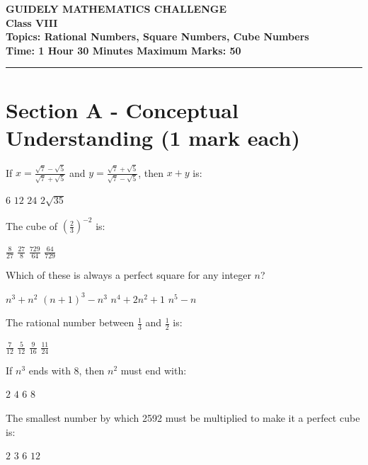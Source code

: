 \documentclass[11pt,a4paper]{exam}
\newcommand{\FULLMARKS}{Maximum Marks: 50}
\newcommand{\FULLTIME}{Time: 1 Hour 30 Minutes}
\newcommand{\GetInstructions}{
	\section*{General Instructions:}
	\begin{enumerate}
		\item All questions are compulsory
		\item Show all working steps for full marks
		\item Use mathematical reasoning to justify your answers
		\item Calculators are not permitted
		\item Extra credit will be given for elegant solutions
	\end{enumerate}
}
\begin{document}
	
	\begin{center}
		\Large\textbf{GUIDELY MATHEMATICS CHALLENGE} \\
		\large\textbf{Class VIII} \\
		\textbf{Topics: Rational Numbers, Square Numbers, Cube Numbers} \\
		\textbf{\FULLTIME \hspace{1cm} \FULLMARKS} \\
		\rule{\textwidth}{1pt}
	\end{center}
	
	
	\section*{Section A - Conceptual Understanding (1 mark each)}
	\begin{questions}
		\question If $x = \frac{\sqrt{7} - \sqrt{5}}{\sqrt{7} + \sqrt{5}}$ and $y = \frac{\sqrt{7} + \sqrt{5}}{\sqrt{7} - \sqrt{5}}$, then $x + y$ is:
		\begin{choices}
			\choice $6$
			\choice $12$
			\choice $24$
			\choice $2\sqrt{35}$
		\end{choices}
		
		\question The cube of $\left(\frac{2}{3}\right)^{-2}$ is:
		\begin{choices}
			\choice $\frac{8}{27}$
			\choice $\frac{27}{8}$
			\choice $\frac{729}{64}$
			\choice $\frac{64}{729}$
		\end{choices}
		
		\question Which of these is always a perfect square for any integer $n$?
		\begin{choices}
			\choice $n^3 + n^2$
			\choice $(n+1)^3 - n^3$
			\choice $n^4 + 2n^2 + 1$
			\choice $n^5 - n$
		\end{choices}
		
		\question The rational number between $\frac{1}{3}$ and $\frac{1}{2}$ is:
		\begin{choices}
			\choice $\frac{7}{12}$
			\choice $\frac{5}{12}$
			\choice $\frac{9}{16}$
			\choice $\frac{11}{24}$
		\end{choices}
		
		\question If $n^3$ ends with 8, then $n^2$ must end with:
		\begin{choices}
			\choice $2$
			\choice $4$
			\choice $6$
			\choice $8$
		\end{choices}
		
		\question The smallest number by which 2592 must be multiplied to make it a perfect cube is:
		\begin{choices}
			\choice $2$
			\choice $3$
			\choice $6$
			\choice $12$
		\end{choices}
	\end{questions}
	
\end{document}
